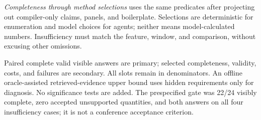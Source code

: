 \emph{Completeness through method selections} uses the same predicates after projecting out compiler-only claims, panels, and boilerplate. Selections are deterministic for enumeration and model choices for agents; neither means model-calculated numbers. Insufficiency must match the feature, window, and comparison, without excusing other omissions.

Paired complete valid visible answers are primary; selected completeness, validity, costs, and failures are secondary. All slots remain in denominators. An offline oracle-assisted retrieved-evidence upper bound uses hidden requirements only for diagnosis. No significance tests are added. The prespecified gate was 22/24 visibly complete, zero accepted unsupported quantities, and both answers on all four insufficiency cases; it is not a conference acceptance criterion.
